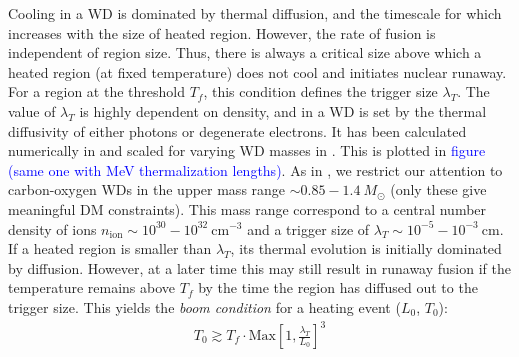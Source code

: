 \documentclass[twocolumn,preprintnumbers,amsmath,amssymb,prl, superscriptaddress]{revtex4}
\newcommand{\cm}{\text{cm}}
\begin{document}
Cooling in a WD is dominated by thermal diffusion, and the timescale for which increases with the size of heated region.
However, the rate of fusion is independent of region size.
Thus, there is always a critical size above which a heated region (at fixed temperature) does not cool and initiates nuclear runaway.
For a region at the threshold $T_f$, this condition defines the trigger size $\lambda_T$.
The value of $\lambda_T$ is highly dependent on density, and in a WD is set by the thermal diffusivity of either photons or degenerate electrons.
It has been calculated numerically in \cite{Woosley} and scaled for varying WD masses in \cite{Graham:2015apa}.
This is plotted in \textcolor{blue}{figure (same one with MeV thermalization lengths)}.
As in \cite{Graham:2015apa}, we restrict our attention to carbon-oxygen WDs in the upper mass range $\sim 0.85 - 1.4 ~M_{\odot}$ (only these give meaningful DM constraints).
This mass range correspond to a central number density of ions $n_\text{ion} \sim 10^{30} - 10^{32} ~\cm^{-3}$ and a trigger size of $\lambda_T \sim 10^{-5} - 10^{-3} ~\text{cm}$.
If a heated region is smaller than $\lambda_T$, its thermal evolution is initially dominated by diffusion.
However, at a later time this may still result in runaway fusion if the temperature remains above $T_f$ by the time the region has diffused out to the trigger size.
This yields the \emph{boom condition} for a heating event ($L_0$, $T_0$):
\begin{align}
    \label{eq:boom_condition}
    T_0 \gtrsim T_f \cdot \text{Max}\left[1, \frac{\lambda_T}{L_0}\right]^3
\end{align}
\end{document}
